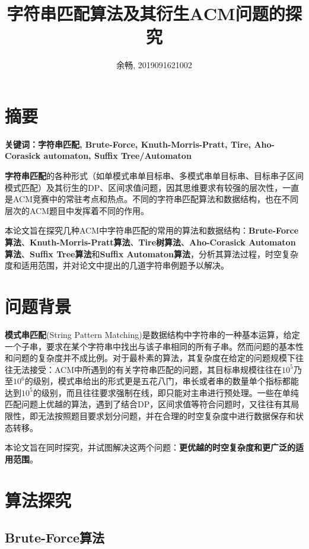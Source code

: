 \documentclass[UTF8]{ctexart}
\title{字符串匹配算法及其衍生ACM问题的探究}
\author{余畅, 2019091621002}
\begin{document}
\maketitle

\section{摘要}
\textbf{关键词：字符串匹配, Brute-Force, Knuth-Morris-Pratt, Tire, Aho-Corasick automaton, Suffix Tree/Automaton} \par
\textbf{字符串匹配}的各种形式（如单模式串单目标串、多模式串单目标串、目标串子区间模式匹配）及其衍生的DP、区间求值问题，因其思维要求有较强的层次性，一直是ACM竞赛中的常驻考点和热点。不同的字符串匹配算法和数据结构，也在不同层次的ACM题目中发挥着不同的作用。\par
本论文旨在探究几种ACM中字符串匹配的常用的算法和数据结构：\textbf{Brute-Force算法}、\textbf{Knuth-Morris-Pratt算法}、\textbf{Tire树算法}、\textbf{Aho-Corasick Automaton算法}、\textbf{Suffix Tree算法}和\textbf{Suffix Automaton算法}，分析其算法过程，时空复杂度和适用范围，并对论文中提出的几道字符串例题予以解决。

\section{问题背景}

\textbf{模式串匹配}(String Pattern Matching)是数据结构中字符串的一种基本运算，给定一个子串，要求在某个字符串中找出与该子串相同的所有子串。然而问题的基本性和问题的复杂度并不成比例。对于最朴素的算法，其复杂度在给定的问题规模下往往无法接受：ACM中所遇到的有关字符串匹配的问题，其目标串规模往往在$10^5$乃至$10^6$的级别，模式串给出的形式更是五花八门，串长或者串的数量单个指标都能达到$10^5$的级别，而且往往要求强制在线，即只能对主串进行预处理。一些在单纯匹配问题上优越的算法，遇到了结合DP，区间求值等符合问题时，又往往有其局限性，即无法按照题目要求划分问题，并在合理的时空复杂度中进行数据保存和状态转移。 \par
本论文旨在同时探究，并试图解决这两个问题：\textbf{更优越的时空复杂度和更广泛的适用范围}。

\section{算法探究}

\subsection {Brute-Force算法}
\end{document}
